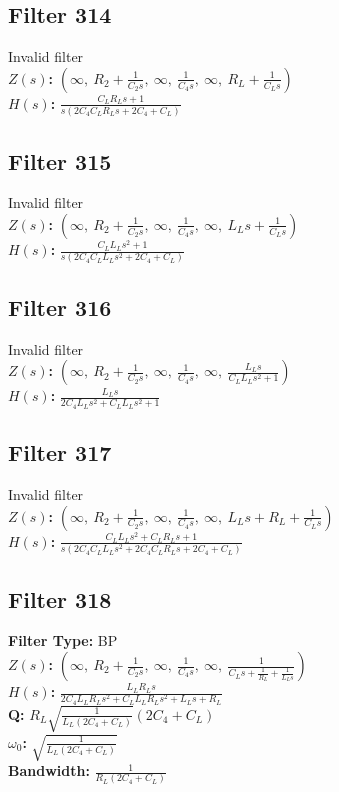 \documentclass{article}
\begin{document}
\subsection*{Filter 314}
Invalid filter \\ 
\textbf{$Z(s)$:} $\left( \infty, \  R_{2} + \frac{1}{C_{2} s}, \  \infty, \  \frac{1}{C_{4} s}, \  \infty, \  R_{L} + \frac{1}{C_{L} s}\right)$ \\ 
\textbf{$H(s)$:} $\frac{C_{L} R_{L} s + 1}{s \left(2 C_{4} C_{L} R_{L} s + 2 C_{4} + C_{L}\right)}$ \\ 
\subsection*{Filter 315}
Invalid filter \\ 
\textbf{$Z(s)$:} $\left( \infty, \  R_{2} + \frac{1}{C_{2} s}, \  \infty, \  \frac{1}{C_{4} s}, \  \infty, \  L_{L} s + \frac{1}{C_{L} s}\right)$ \\ 
\textbf{$H(s)$:} $\frac{C_{L} L_{L} s^{2} + 1}{s \left(2 C_{4} C_{L} L_{L} s^{2} + 2 C_{4} + C_{L}\right)}$ \\ 
\subsection*{Filter 316}
Invalid filter \\ 
\textbf{$Z(s)$:} $\left( \infty, \  R_{2} + \frac{1}{C_{2} s}, \  \infty, \  \frac{1}{C_{4} s}, \  \infty, \  \frac{L_{L} s}{C_{L} L_{L} s^{2} + 1}\right)$ \\ 
\textbf{$H(s)$:} $\frac{L_{L} s}{2 C_{4} L_{L} s^{2} + C_{L} L_{L} s^{2} + 1}$ \\ 
\subsection*{Filter 317}
Invalid filter \\ 
\textbf{$Z(s)$:} $\left( \infty, \  R_{2} + \frac{1}{C_{2} s}, \  \infty, \  \frac{1}{C_{4} s}, \  \infty, \  L_{L} s + R_{L} + \frac{1}{C_{L} s}\right)$ \\ 
\textbf{$H(s)$:} $\frac{C_{L} L_{L} s^{2} + C_{L} R_{L} s + 1}{s \left(2 C_{4} C_{L} L_{L} s^{2} + 2 C_{4} C_{L} R_{L} s + 2 C_{4} + C_{L}\right)}$ \\ 
\subsection*{Filter 318}
\textbf{Filter Type:} BP \\ 
\textbf{$Z(s)$:} $\left( \infty, \  R_{2} + \frac{1}{C_{2} s}, \  \infty, \  \frac{1}{C_{4} s}, \  \infty, \  \frac{1}{C_{L} s + \frac{1}{R_{L}} + \frac{1}{L_{L} s}}\right)$ \\ 
\textbf{$H(s)$:} $\frac{L_{L} R_{L} s}{2 C_{4} L_{L} R_{L} s^{2} + C_{L} L_{L} R_{L} s^{2} + L_{L} s + R_{L}}$ \\ 
\textbf{Q:} $R_{L} \sqrt{\frac{1}{L_{L} \left(2 C_{4} + C_{L}\right)}} \left(2 C_{4} + C_{L}\right)$ \\ 
\textbf{$\omega_0$:} $\sqrt{\frac{1}{L_{L} \left(2 C_{4} + C_{L}\right)}}$ \\ 
\textbf{Bandwidth:} $\frac{1}{R_{L} \left(2 C_{4} + C_{L}\right)}$ \\ 
\end{document}

